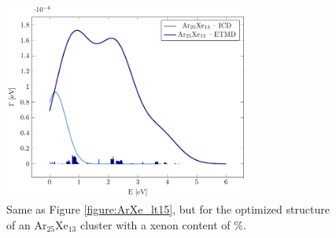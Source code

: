 \begin{figure}
 \centering
 \includegraphics[width=8.0cm]{pics/Ar25Xe13.pdf}
 \caption{
          Same as Figure \ref{figure:ArXe_lt15}, but for the 
          optimized structure of an Ar$_{25}$Xe$_{13}$ cluster 
          with a xenon content of \unit[34]{\%}.}
 \label{}
\end{figure}


